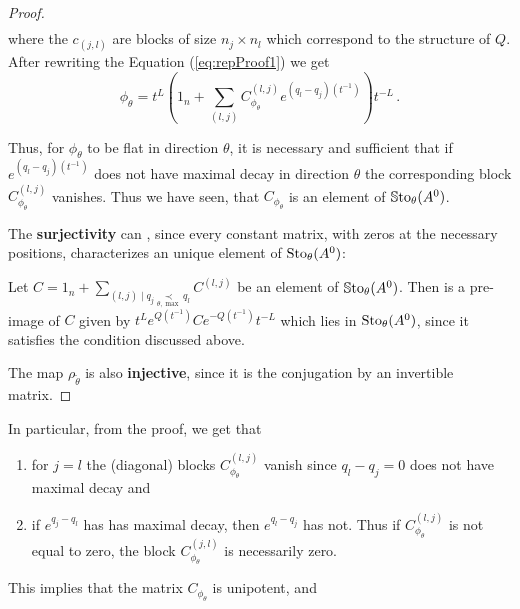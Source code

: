 \begin{proof}
\begin{align*}
  \end{align*}
  where the $c_{(j,l)}$ are blocks of size $n_j\times n_l$ which correspond to the structure of
  $Q$. After rewriting the Equation (\ref{eq:repProof1}) we get
  \[
    \phi_\theta=
      t^L\left(
        1_n+\sum_{(l,j)}C_{\phi_\theta}^{(l,j)}e^{(q_l-q_j)(t^{-1})}
      \right)t^{-L} \,.
  \]
  \begin{comment}
    \begin{align*}
      \phi_\theta(t)
      &=t^Le^{Q(t^{-1})}\left(
        1_n+C_{\phi_\theta}
      \right)e^{-Q(t^{-1})}t^{-L}
    \\&=t^Le^{Q(t^{-1})}\left(
        1_n+\sum_{(l,j)}C_{\phi_\theta}^{(l,j)}
      \right)e^{-Q(t^{-1})}t^{-L}
    \\&=t^L\left(
        1_n+\sum_{(l,j)}e^{Q(t^{-1})}C_{\phi_\theta}^{(l,j)}e^{-Q(t^{-1})}
      \right)t^{-L}
    \\&=t^L\left(
          1_n+\sum_{(l,j)}C_{\phi_\theta}^{(l,j)}e^{(q_l-q_j)(t^{-1})}
        \right)t^{-L} \,.
    \end{align*}
  \end{comment}
  Thus, for $\phi_{\theta}$ to be flat in direction $\theta$, it is
  necessary and sufficient that if $e^{(q_l-q_j)(t^{-1})}$ does not have
  maximal decay in direction $\theta$ the corresponding
  block $C_{\phi_\theta}^{(l,j)}$ vanishes.
  Thus we have seen, that $C_{\phi_\theta}$ is an
  element of $\operatorname{\mathbb{S}to}_\theta(A^0)$.

  The \textbf{surjectivity} can , since every constant
  matrix, with zeros at the necessary positions, characterizes an unique
  element of $\operatorname{Sto}_\theta(A^0)$:
  \begin{einr}
    Let $C=1_n + \sum_{(l,j)\mid q_j\underset{\theta,\max}{\prec}q_l}
    C^{(l,j)}$ be an element of $\operatorname{\mathbb{S}to}_\theta(A^0)$.  Then is a pre-image of
    $C$ given by $t^L e^{Q(t^{-1})}Ce^{-Q(t^{-1})}t^{-L}$ which lies in
    $\operatorname{Sto}_\theta(A^0)$, since it satisfies the condition discussed above.
  \end{einr}

  The map $\rho_{\tilde\theta}$ is also \textbf{injective}, since it is the
  conjugation by an invertible matrix.
\end{proof}

In particular, from the proof, we get that
\begin{enumerate}
  \item for $j=l$ the (diagonal) blocks $C_{\phi_\theta}^{(l,j)}$ vanish since
    $q_l-q_j=0$ does not have maximal decay and
  \item if $e^{q_j-q_l}$ has has maximal decay, then $e^{q_l-q_j}$ has not.
    Thus if $C_{\phi_\theta}^{(l,j)}$ is not equal to zero, the block
    $C_{\phi_\theta}^{(j,l)}$ is necessarily zero.
\end{enumerate}
This implies that the matrix $C_{\phi_\theta}$ is unipotent, and 

